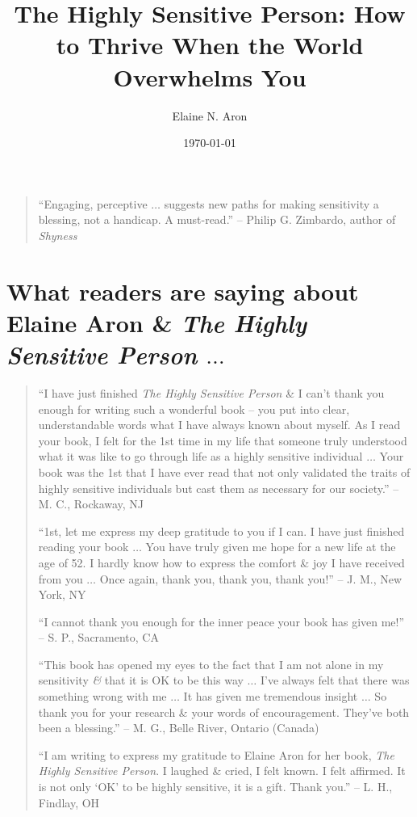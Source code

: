 \documentclass{article}
\title{The Highly Sensitive Person: How to Thrive When the World Overwhelms You}
\author{Elaine N. Aron}
\date{\today}
\numberwithin{equation}{section}
\begin{document}
\maketitle
\tableofcontents

\begin{quotation}
	``Engaging, perceptive $\ldots$ suggests new paths for making sensitivity a blessing, not a handicap. A must-read.'' -- Philip G. Zimbardo, author of \textit{Shyness}
\end{quotation}

\section*{What readers are saying about Elaine Aron \& \textit{The Highly Sensitive Person} $\ldots$}

\begin{quotation}
	``I have just finished \textit{The Highly Sensitive Person} \& I can't thank you enough for writing such a wonderful book -- you put into clear, understandable words what I have always known about myself. As I read your book, I felt for the 1st time in my life that someone truly understood what it was like to go through life as a highly sensitive individual $\ldots$ Your book was the 1st that I have ever read that not only validated the traits of highly sensitive individuals but cast them as necessary for our society.'' -- M. C., Rockaway, NJ
	
	``1st, let me express my deep gratitude to you if I can. I have just finished reading your book $\ldots$ You have truly given me hope for a new life at the age of 52. I hardly know how to express the comfort \& joy I have received from you $\ldots$ Once again, thank you, thank you, thank you!'' -- J. M., New York, NY
	
	``I cannot thank you enough for the inner peace your book has given me!'' -- S. P., Sacramento, CA
	
	``This book has opened my eyes to the fact that I am not alone in my sensitivity \textit{\&} that it is OK to be this way $\ldots$ I've always felt that there was something wrong with me $\ldots$ It has given me tremendous insight $\ldots$ So thank you for your research \& your words of encouragement. They've both been a blessing.'' -- M. G., Belle River, Ontario (Canada)
	
	``I am writing to express my gratitude to Elaine Aron for her book, \textit{The Highly Sensitive Person}. I laughed \& cried, I felt known. I felt affirmed. It is not only `OK' to be highly sensitive, it is a gift. Thank you.'' -- L. H., Findlay, OH
	

\end{quotation}
\end{document}
